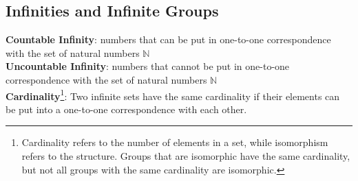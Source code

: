 \documentclass[12pt, letterpaper]{article}
\begin{document}
\subsection{Infinities and Infinite Groups}
\textbf{Countable Infinity}: numbers that can be put in one-to-one correspondence with the set of natural numbers \(\mathbb{N}\)\\
\textbf{Uncountable Infinity}: numbers that cannot be put in one-to-one correspondence with the set of natural numbers \(\mathbb{N}\)\\
\textbf{Cardinality}\footnote{Cardinality refers to the number of elements in a set, while isomorphism refers to the structure. Groups that are isomorphic have the same cardinality, but not all groups with the same cardinality are isomorphic.}: Two infinite sets have the same cardinality if their elements can be put into a one-to-one correspondence with each other.
\end{document}
